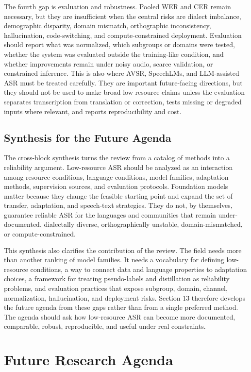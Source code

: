 \documentclass[pdflatex,sn-basic]{sn-jnl}
\theoremstyle{thmstyleone}
\theoremstyle{thmstyletwo}
\theoremstyle{thmstylethree}
\begin{document}
The fourth gap is evaluation and robustness. Pooled WER and CER remain necessary, but they are insufficient when the central risks are dialect imbalance, demographic disparity, domain mismatch, orthographic inconsistency, hallucination, code-switching, and compute-constrained deployment. Evaluation should report what was normalized, which subgroups or domains were tested, whether the system was evaluated outside the training-like condition, and whether improvements remain under noisy audio, scarce validation, or constrained inference. This is also where AVSR, SpeechLMs, and LLM-assisted ASR must be treated carefully. They are important future-facing directions, but they should not be used to make broad low-resource claims unless the evaluation separates transcription from translation or correction, tests missing or degraded inputs where relevant, and reports reproducibility and cost.

\subsection{Synthesis for the Future Agenda}

The cross-block synthesis turns the review from a catalog of methods into a reliability argument. Low-resource ASR should be analyzed as an interaction among resource conditions, language conditions, model families, adaptation methods, supervision sources, and evaluation protocols. Foundation models matter because they change the feasible starting point and expand the set of transfer, adaptation, and speech-text strategies. They do not, by themselves, guarantee reliable ASR for the languages and communities that remain under-documented, dialectally diverse, orthographically unstable, domain-mismatched, or compute-constrained.

This synthesis also clarifies the contribution of the review. The field needs more than another ranking of model families. It needs a vocabulary for defining low-resource conditions, a way to connect data and language properties to adaptation choices, a framework for treating pseudo-labels and distillation as reliability problems, and evaluation practices that expose subgroup, domain, channel, normalization, hallucination, and deployment risks. Section 13 therefore develops the future agenda from these gaps rather than from a single preferred method. The agenda should ask how low-resource ASR can become more documented, comparable, robust, reproducible, and useful under real constraints.

\section{Future Research Agenda}
\end{document}
